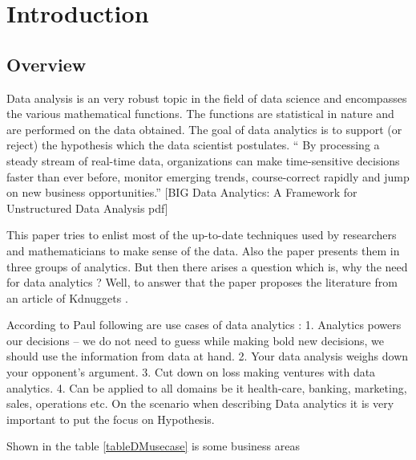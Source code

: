 \setlength{\footskip}{8mm}

\chapter{Introduction}


\section{Overview}

Data analysis is an very robust topic in the field of data science and encompasses the various mathematical functions. The functions are statistical in nature and are performed on the data obtained. The goal of data analytics is to support (or reject) the hypothesis which the data scientist postulates.
“ By processing a steady stream of real-time data, organizations can make time-sensitive decisions faster than ever before, monitor emerging trends, course-correct rapidly and jump on new business opportunities.” [BIG Data Analytics: A Framework for Unstructured Data Analysis pdf]

This paper tries to enlist most of the up-to-date techniques used by researchers and mathematicians to make sense of the data. Also the paper presents them in three groups of analytics.
But then there arises a question which is, why the need for data analytics ? Well, to answer that the paper proposes the literature from an article of Kdnuggets .



According to Paul following are use cases  of data analytics :
1. Analytics powers our decisions – we do not need to guess while making bold new decisions, we should use the information from data at hand.
2. Your data analysis weighs down your opponent's argument.
3. Cut down on loss making ventures with data analytics.
4. Can be applied to all domains be it health-care, banking, marketing, sales, operations etc.
On the scenario when describing Data analytics it is very important to put the focus on Hypothesis.

Shown in the table \ref{tableDMusecase} is some business areas 


